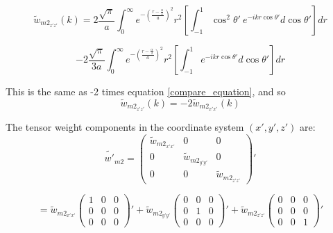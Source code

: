 \documentclass[double,12pt]{beavtex}
\begin{document}
\begin{displaymath}{\widetilde{w}_{{m2}_{z'z'}}(k)=2\frac{\sqrt{\pi}}{a}\int_{0}^{\infty}e^{-\left(\frac{r-\frac{\alpha}{2}}{a}\right)^2}r^2\left[\int_{-1}^{1}\cos^2\theta'~e^{-ikr\cos\theta'}d{\cos\theta'}\right]d{r}}\end{displaymath} 

\begin{equation}{-2\frac{\sqrt{\pi}}{3a}\int_{0}^{\infty}e^{-\left(\frac{r-\frac{\alpha}{2}}{a}\right)^2}r^2\left[\int_{-1}^{1}e^{-ikr\cos\theta'}d{\cos\theta'}\right]d{r}}\end{equation} 

This is the same as -2 times equation \ref{compare_equation}, and so \begin{equation}{\widetilde{w}_{{m2}_{z'z'}}(k)=-2\widetilde{w}_{{m2}_{x'x'}}(k)}\end{equation}

\noindent The tensor weight components in the coordinate system 
$(x',y',z')$ are:
\begin{equation}\label{tensorcomp}{\widetilde{w'}_{m2}=\left(\begin{array}{ccc} \widetilde{w}_{{m2}_{x'x'}} & 0 & 0 \\ 0 & \widetilde{w}_{{m2}_{y'y'}} & 0 \\ 0 & 0 & \widetilde{w}_{{m2}_{z'z'}} \end{array}\right)'}\end{equation}

\begin{displaymath}{=\widetilde{w}_{{m2}_{x'x'}}\left(\begin{array}{ccc} 1 & 0 & 0 \\ 0 & 0 & 0 \\ 0 & 0 & 0 \end{array}\right)'+ \widetilde{w}_{{m2}_{y'y'}}\left(\begin{array}{ccc} 0 & 0 & 0 \\ 0 & 1 & 0 \\ 0 & 0 & 0 \end{array}\right)' + \widetilde{w}_{{m2}_{z'z'}}\left(\begin{array}{ccc} 0 & 0 & 0 \\ 0 & 0 & 0 \\ 0 & 0 & 1 \end{array}\right)'}\end{displaymath}
\end{document}
